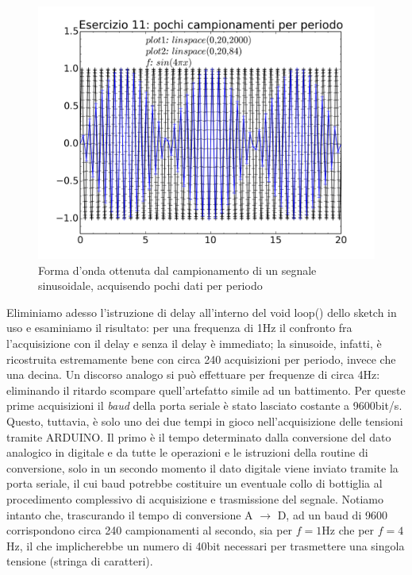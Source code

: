 \documentclass[journal, a4paper]{IEEEtran}
\begin{document}
\begin{figure}
\centering
\includegraphics[width=0.9\linewidth]{./soluzione_es11_3batt}
\caption{Forma d'onda ottenuta dal campionamento di un segnale sinusoidale, acquisendo pochi dati per periodo}
\label{fig:soluzione_es11_3batt}
\end{figure}

Eliminiamo adesso l'istruzione di delay all'interno del void loop() dello sketch in uso e esaminiamo il risultato: per una frequenza di 1Hz il confronto fra l'acquisizione con il delay e senza il delay è immediato; la sinusoide, infatti, è ricostruita estremamente bene con circa 240 acquisizioni per periodo, invece che una decina. Un discorso analogo si può effettuare per frequenze di circa 4Hz: eliminando il ritardo scompare quell'artefatto simile ad un battimento. Per queste prime acquisizioni il \textit{baud} della porta seriale è stato lasciato costante a 9600bit/s. Questo, tuttavia, è solo uno dei due tempi in gioco nell'acquisizione delle tensioni tramite ARDUINO. Il primo è il tempo determinato dalla conversione del dato analogico in digitale e da tutte le operazioni e le istruzioni della routine di conversione, solo in un secondo momento il dato digitale viene inviato tramite la porta seriale, il cui baud potrebbe costituire un eventuale collo di bottiglia al procedimento complessivo di acquisizione e trasmissione del segnale. Notiamo intanto che, trascurando il tempo di conversione A $\rightarrow$ D, ad un baud di 9600 corrispondono circa 240 campionamenti al secondo, sia per $f=1$Hz che per $f=4$Hz, il che implicherebbe un numero di 40bit necessari per trasmettere una singola tensione (stringa di caratteri).\\
\end{document}
